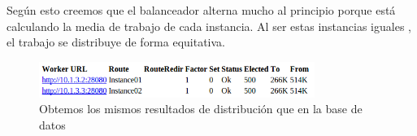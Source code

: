\documentclass[a4paper, 10pt]{article}
\begin{document}
Según esto creemos que el balanceador alterna mucho al principio porque está calculando la media de trabajo de cada instancia. Al ser estas instancias iguales , el trabajo se distribuye de forma equitativa.

\begin{figure}[hbtp]
	\centering
	\includegraphics[width=0.8\textwidth]{../../P3/pantallazos/ej9_manager.png}
	\caption { Obtemos los mismos resultados de distribución que en la base de datos }
\end{figure}
\end{document}
